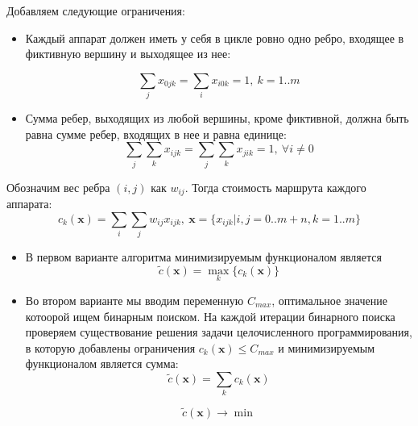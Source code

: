 \documentclass[a4paper,14pt,russian]{article}
\begin{document}
Добавляем следующие ограничения:
\begin{itemize}

\item Каждый аппарат должен иметь у себя в цикле ровно одно ребро, входящее в фиктивную вершину и выходящее из нее:

\begin{equation} \label{lin1}
 \displaystyle\sum_j x_{0 j k} = \displaystyle\sum_i x_{i 0 k} = 1, ~k = 1..m
\end{equation}

\item Сумма ребер, выходящих из любой вершины, кроме фиктивной, должна быть равна сумме ребер, входящих в нее и равна единице:
\begin{equation}
\displaystyle\sum_j \displaystyle\sum_k x_{i j k} = \displaystyle\sum_j \displaystyle\sum_k x_{j i k} = 1, ~\forall i \neq 0
\end{equation}

\end{itemize}

Обозначим вес ребра $(i, j)$ как $w_{i j}$. Тогда стоимость маршрута каждого аппарата:
\begin{equation}
c_k(\mathbf{x}) = \displaystyle\sum_i \displaystyle\sum_j w_{i j} x_{i j k}, ~\mathbf{x} = \{x_{i j k} | i, j = 0..m+n, k = 1..m\}
\end{equation}


\begin{itemize}
\item В первом варианте алгоритма минимизируемым функционалом является
\begin{equation}
\widetilde{c}(\mathbf{x}) = \displaystyle\max_k \{c_k(\mathbf{x})\}
\end{equation}

\item Во втором варианте мы вводим переменную $C_{max}$, оптимальное значение котоорой ищем бинарным поиском. На каждой итерации бинарного поиска проверяем существование решения задачи целочисленного программирования, в которую добавлены ограничения $c_k(\mathbf{x}) \le C_{max}$ и минимизируемым функционалом является сумма:
\begin{equation}
\widetilde{c}(\mathbf{x}) = \displaystyle\sum_k c_k(\mathbf{x})
\end{equation}

\begin{equation} \label{lin2}
\widetilde{c}(\mathbf{x}) \rightarrow \min
\end{equation}

\end{itemize}
\end{document}
